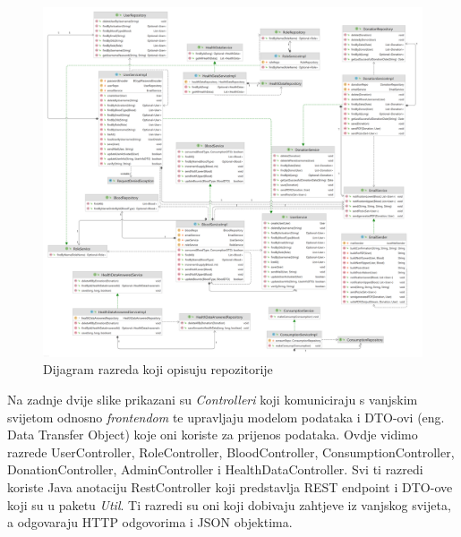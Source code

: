 \begin{figure}[H]
	\centering
	\includegraphics[width=\textwidth, scale=2.0]{dijagrami/dijagram_razreda2}
	\caption{Dijagram razreda koji opisuju repozitorije}
	\label{fig:dijagram_repozitorija}
\end{figure}

\eject

	Na zadnje dvije slike prikazani su \textit{Controlleri} koji komuniciraju s vanjskim svijetom odnosno \textit{frontendom} te upravljaju modelom podataka i DTO-ovi (eng. Data Transfer Object) koje oni koriste za prijenos podataka. Ovdje vidimo razrede UserController, RoleController, BloodController, ConsumptionController, DonationController, AdminController i HealthDataController. Svi ti razredi koriste Java anotaciju RestController koji predstavlja REST endpoint i DTO-ove koji su u paketu \textit{Util}. Ti razredi su oni koji dobivaju zahtjeve iz vanjskog svijeta, a odgovaraju HTTP odgovorima i JSON objektima.

